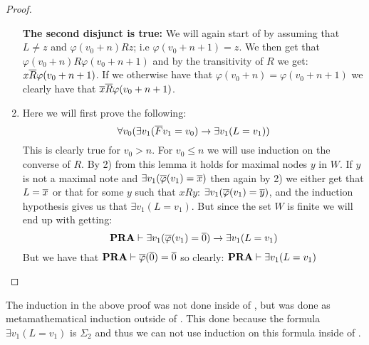 \documentclass[../main.tex]{subfiles}
\begin{document}
\begin{proof}
\begin{enumerate}
			\textbf{The second disjunct is true:} We will again
			start of by assuming that $L\not =z$ and
			$\varphi(v_0+n)Rz$; i.e $\varphi(v_0+n+1)=z$. We then
			get that $\varphi(v_0+n)R\varphi(v_0+n+1)$ and by the
			transitivity of $R$ we get: $x\overline R\varphi(v_0+n+1)$.
			If we otherwise have that
			$\varphi(v_0+n)=\varphi(v_0+n+1)$ we clearly have that
			$\overline x\overline R\varphi(v_0+n+1)$.

		\item Here we will first prove the following:
			$$\forall v_0(\exists v_1(\overline
			Fv_1=v_0)\rightarrow\exists v_1(L=v_1))$$
			This is clearly true for $v_0> n$. For $v_0\leq n$ we
			will use induction on the converse of $R$. By 2) from
			this lemma it holds for maximal nodes $y$ in $W$. If
			$y$ is not a maximal note and $\exists v_1(\overline
			\varphi(v_1)=\overline x)$ then again by 2) we either get
			that $L=\overline x$ or that for some $y$ such that $xRy$:
			$\exists v_1(\overline \varphi(v_1)=\overline y)$, and the induction
			hypothesis gives us that $\exists v_1(L=v_1)$. But
			since the set $W$ is finite we will end up with
			getting:
			\[\text{\textbf{PRA}}\vdash\exists v_1(\overline\varphi(v_1)=\overline
			0)\rightarrow\exists v_1(L=v_1)\]
			But we have that $\text{\textbf{PRA}}\vdash \overline \varphi(\overline 0)=\overline 0$
			so clearly: $\text{\textbf{PRA}}\vdash\exists v_1(L=v_1)$
\end{enumerate}
\end{proof}

The induction in the above proof was not done inside of \PRA, but was done as
metamathematical induction outside of \PRA. This done because the formula
$\exists v_1(L=v_1)$ is $\Sigma_2$ and thus we can not use induction on this
formula inside of \PRA. 
\end{document}
